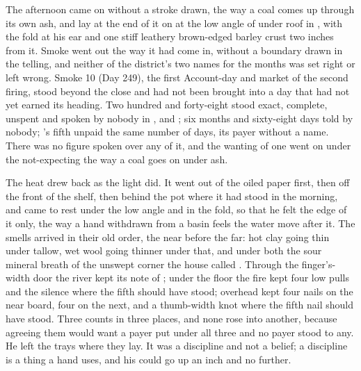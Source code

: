 The afternoon came on without a stroke drawn, the way a coal comes up through its own ash, and  lay at the end of it on  at the low angle of  under  roof in , with the fold at his ear and one stiff leathery brown-edged barley crust two inches from it. Smoke went out the way it had come in, without a boundary drawn in the telling, and neither of the district's two names for the months was set right or left wrong. Smoke 10 (Day 249), the first Account-day and market of the second firing, stood beyond the close and had not been brought into a day that had not yet earned its heading. Two hundred and forty-eight stood exact, complete, unspent and spoken by nobody in ,  and ; six months and sixty-eight days told by nobody; 's fifth unpaid the same number of days, its payer without a name. There was no figure spoken over any of it, and the wanting of one went on under the not-expecting the way a coal goes on under ash.

The heat drew back as the light did. It went out of the oiled paper first, then off the front of the shelf, then behind the pot where it had stood in the morning, and came to rest under the low angle and in the fold, so that he felt the edge of it only, the way a hand withdrawn from a basin feels the water move after it. The smells arrived in their old order, the near before the far: hot clay going thin under tallow, wet wool going thinner under that, and under both the sour mineral breath of the unswept corner the house called . Through the finger's-width door the river kept its note of ; under the floor the fire kept four low pulls and the silence where the fifth should have stood; overhead  kept four nails on the near board, four on the next, and a thumb-width knot where the fifth nail should have stood. Three counts in three places, and none rose into another, because agreeing them would want a payer put under all three and no payer stood to any. He left the trays where they lay. It was a discipline and not a belief; a discipline is a thing a hand uses, and his could go up an inch and no further.

